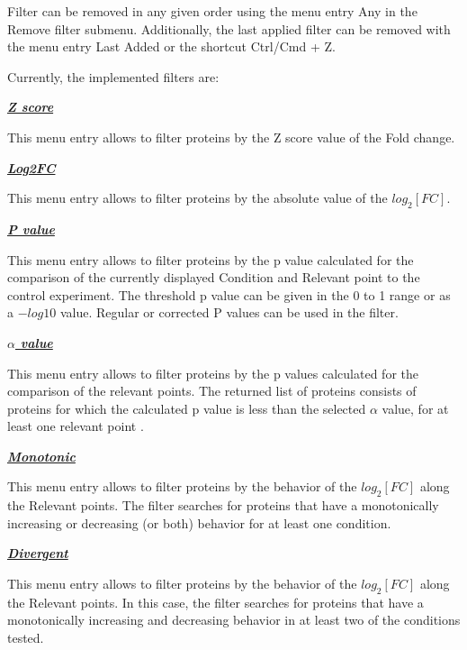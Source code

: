 Filter can be removed in any given order using the menu entry Any in the Remove filter submenu. Additionally, the last applied filter can be removed with the menu entry Last Added or the shortcut Ctrl/Cmd + Z.

Currently, the implemented filters are:

\textbf{\textit{\underline{Z score}}}

This menu entry allows to filter proteins by the Z score value of the Fold change. 

\textbf{\textit{\underline{Log2FC}}}

This menu entry allows to filter proteins by the absolute value of the $log_2[FC]$. 

\textbf{\textit{\underline{P value}}}

This menu entry allows to filter proteins by the p value calculated for the comparison of the currently displayed  Condition and Relevant point to the control experiment. The threshold p value can be given in the 0 to 1 range or as a $-log10$ value. Regular or corrected P values can be used in the filter.

\textbf{\textit{\underline{$\alpha$ value}}}

This menu entry allows to filter proteins by the p values calculated for the comparison of the relevant points. The returned list of proteins consists of proteins for which the calculated p value is less than the selected $\alpha$ value, for at least one relevant point .

\textbf{\textit{\underline{Monotonic}}}

This menu entry allows to filter proteins by the behavior of the $log_2[FC]$ along the Relevant points. The filter searches for proteins that have a monotonically increasing or decreasing (or both) behavior for at least one condition. 

\textbf{\textit{\underline{Divergent}}}

This menu entry allows to filter proteins by the behavior of the $log_2[FC]$ along the Relevant points. In this case, the filter searches for proteins that have a monotonically increasing and decreasing behavior in at least two of the conditions tested.




































